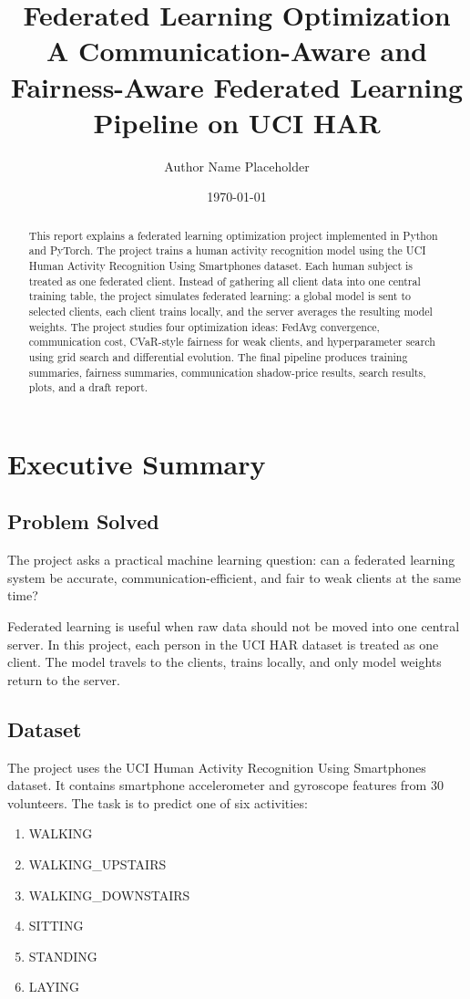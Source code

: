 \documentclass{article}
\title{\textbf{Federated Learning Optimization}\\
\large A Communication-Aware and Fairness-Aware Federated Learning Pipeline on UCI HAR}
\author{Author Name Placeholder}
\date{\today}
\begin{document}
\maketitle

\begin{abstract}
This report explains a federated learning optimization project implemented in Python and PyTorch. The project trains a human activity recognition model using the UCI Human Activity Recognition Using Smartphones dataset. Each human subject is treated as one federated client. Instead of gathering all client data into one central training table, the project simulates federated learning: a global model is sent to selected clients, each client trains locally, and the server averages the resulting model weights. The project studies four optimization ideas: FedAvg convergence, communication cost, CVaR-style fairness for weak clients, and hyperparameter search using grid search and differential evolution. The final pipeline produces training summaries, fairness summaries, communication shadow-price results, search results, plots, and a draft report.
\end{abstract}

\newpage
\tableofcontents
\newpage

\section{Executive Summary}

\subsection{Problem Solved}
The project asks a practical machine learning question: can a federated learning system be accurate, communication-efficient, and fair to weak clients at the same time?

Federated learning is useful when raw data should not be moved into one central server. In this project, each person in the UCI HAR dataset is treated as one client. The model travels to the clients, trains locally, and only model weights return to the server.

\subsection{Dataset}
The project uses the UCI Human Activity Recognition Using Smartphones dataset. It contains smartphone accelerometer and gyroscope features from 30 volunteers. The task is to predict one of six activities:
\begin{enumerate}
  \item WALKING
  \item WALKING\_UPSTAIRS
  \item WALKING\_DOWNSTAIRS
  \item SITTING
  \item STANDING
  \item LAYING
\end{enumerate}
\end{document}
